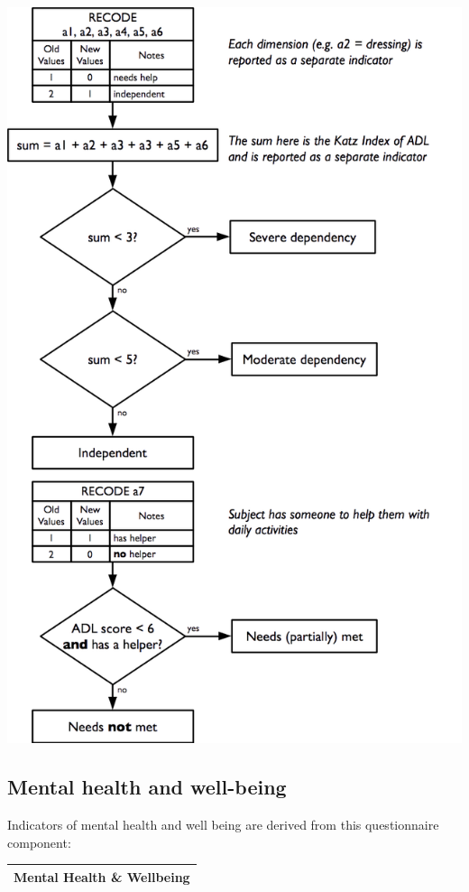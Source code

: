\documentclass[12pt,a4paper]{book}
\theoremstyle{definition}
\theoremstyle{definition}
\theoremstyle{definition}
\theoremstyle{remark}
\begin{document}
\begin{center}\includegraphics{figures/indicators18} \end{center}

\hypertarget{mental-health-and-well-being}{%
\subsection{Mental health and
well-being}\label{mental-health-and-well-being}}

Indicators of mental health and well being are derived from this
questionnaire component:

\begin{longtable}[]{@{}c@{}}
\toprule
\begin{minipage}[t]{0.97\columnwidth}\centering
\textbf{Mental Health \& Wellbeing}\strut
\end{minipage}\tabularnewline
\bottomrule
\end{longtable}
\end{document}
